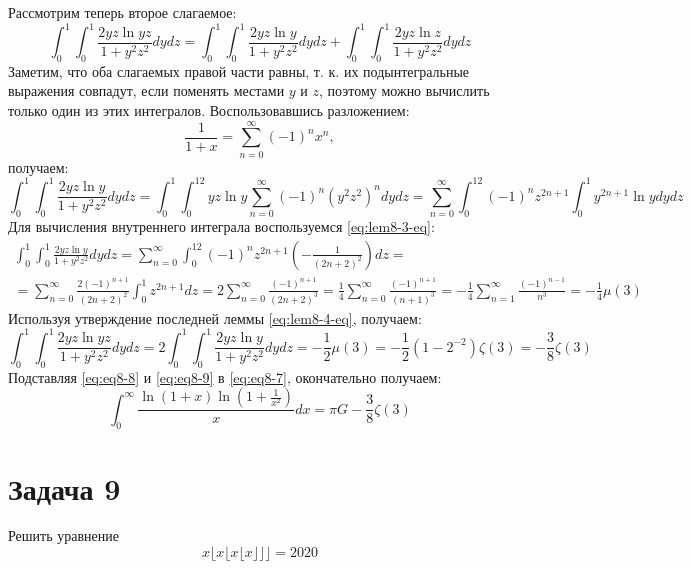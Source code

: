 \documentclass[11pt]{article}
\def\zall{\setcounter{lem}{0}\setcounter{cnsqnc}{0}\setcounter{th}{0}\setcounter{Cmt}{0}\setcounter{equation}{0}}
\newcounter{lem}\setcounter{lem}{0}
\newcounter{th}\setcounter{th}{0}
\newcounter{cnsqnc}\setcounter{cnsqnc}{0}
\newcounter{Cmt}\setcounter{Cmt}{0}
\begin{document}
Рассмотрим теперь второе слагаемое:
\begin{equation*}
\int_0^1\int_0^1\frac{2yz\ln yz}{1 + y^2z^2}dydz = \int_0^1\int_0^1\frac{2yz\ln y}{1 + y^2z^2}dydz + \int_0^1\int_0^1\frac{2yz\ln z}{1 + y^2z^2}dydz
\end{equation*}
Заметим, что оба слагаемых правой части равны, т. к. их подынтегральные выражения совпадут, если поменять местами $y$ и $z$, поэтому можно вычислить только один из этих интегралов. Воспользовавшись разложением:
\begin{equation*}
\frac1{1 + x} = \sum_{n = 0}^{\infty}(-1)^nx^n,
\end{equation*}
получаем:
\begin{equation*}
\int_0^1\int_0^1\frac{2yz\ln y}{1 + y^2z^2}dydz = \int_0^1\int_0^12yz\ln y\sum_{n = 0}^{\infty}(-1)^n(y^2z^2)^ndydz = \sum_{n = 0}^{\infty}\int_0^12(-1)^nz^{2n + 1}\int_0^1y^{2n + 1}\ln ydydz
\end{equation*}
Для вычисления внутреннего интеграла воспользуемся \eqref{eq:lem8-3-eq}:
\begin{multline*}
\int_0^1\int_0^1\frac{2yz\ln y}{1 + y^2z^2}dydz = \sum_{n = 0}^{\infty}\int_0^12(-1)^nz^{2n + 1}\left(-\frac1{(2n + 2)^2}\right)dz = \\
 = \sum_{n = 0}^{\infty}\frac{2(-1)^{n + 1}}{(2n + 2)^2}\int_0^1z^{2n + 1}dz = 2\sum_{n = 0}^{\infty}\frac{(-1)^{n + 1}}{(2n + 2)^3} = \frac14\sum_{n = 0}^{\infty}\frac{(-1)^{n + 1}}{(n + 1)^3} = -\frac14\sum_{n = 1}^{\infty}\frac{(-1)^{n - 1}}{n^3} = -\frac14\mu(3)
\end{multline*}
Используя утверждение последней леммы \eqref{eq:lem8-4-eq}, получаем:
\begin{equation}\label{eq:eq8-9}
\int_0^1\int_0^1\frac{2yz\ln yz}{1 + y^2z^2}dydz = 2\int_0^1\int_0^1\frac{2yz\ln y}{1 + y^2z^2}dydz = -\frac12\mu(3) = -\frac12(1 - 2^{-2})\zeta(3) = -\frac38\zeta(3)
\end{equation}
Подставляя \eqref{eq:eq8-8} и \eqref{eq:eq8-9} в \eqref{eq:eq8-7}, окончательно получаем:
\begin{equation}
\int_0^{\infty}\frac{\ln(1 + x)\ln\left(1 + \frac1{x^2}\right)}xdx = \pi G - \frac38\zeta(3)
\end{equation}
\pagebreak
\section{Задача 9}
\label{sec:org144158e}
\zall
Решить уравнение
\begin{equation}\label{eq:9}
x\lfloor x\lfloor x\lfloor x\rfloor\rfloor\rfloor = 2020
\end{equation}
\end{document}
